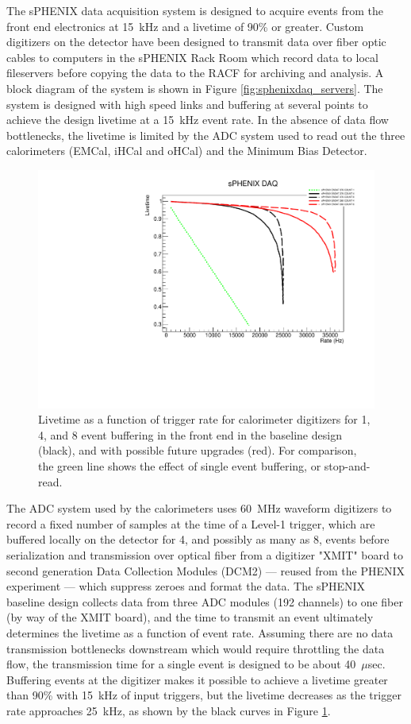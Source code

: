 The sPHENIX data acquisition system is designed to acquire events from
the front end electronics at 15~kHz and a livetime of 90\% or greater.
Custom digitizers on the detector have been designed to transmit data
over fiber optic cables to computers in the sPHENIX Rack Room which
record data to local fileservers before copying the data to the RACF
for archiving and analysis.  A block diagram of the system is shown in
Figure \ref{fig:sphenixdaq_servers}.  The system is designed with high
speed links and buffering at several points to achieve the design
livetime at a 15~kHz event rate.  In the absence of data flow
bottlenecks, the livetime is limited by the ADC system used to read
out the three calorimeters (EMCal, iHCal and oHCal) and the Minimum
Bias Detector.

\begin{figure}
    \centering
    \includegraphics[trim = 0 0 0 25, clip,
    width=0.75\linewidth]{figs/sphenix_daqrate_3.pdf} 
    \caption{Livetime as a function of trigger rate for calorimeter digitizers for
    1, 4, and 8 event buffering in the front end in the baseline design (black),
    and with possible future upgrades (red).  For comparison, the
    green line shows the effect of single event buffering, or
    stop-and-read.} 
    \label{fig:sphenix_daqrate}
\end{figure}

The ADC system used by the calorimeters uses 60~MHz waveform
digitizers to record a fixed number of samples at the time of a
Level-1 trigger, which are buffered locally on the detector for 4, and
possibly as many as 8, events before serialization and transmission
over optical fiber from a digitizer "XMIT" board to second generation
Data Collection Modules (DCM2) --- reused from the PHENIX experiment
--- which suppress zeroes and format the data.  The sPHENIX baseline
design collects data from three ADC modules (192 channels) to one
fiber (by way of the XMIT board), and the time to transmit an event
ultimately determines the livetime as a function of event rate.
Assuming there are no data transmission bottlenecks downstream which
would require throttling the data flow, the transmission time for a
single event is designed to be about 40~$\mu$sec.  Buffering events at
the digitizer makes it possible to achieve a livetime greater than
90\% with 15~kHz of input triggers, but the livetime decreases as the
trigger rate approaches 25~kHz, as shown by the black curves in Figure
\ref{fig:sphenix_daqrate}.

